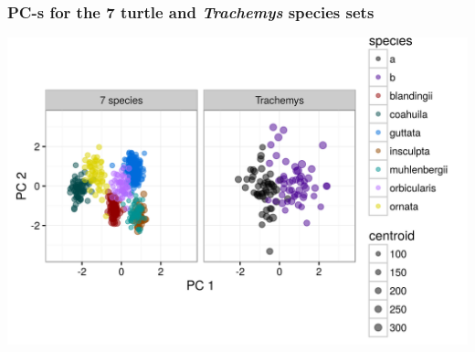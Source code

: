 \documentclass{beamer}
\begin{document}
\begin{frame}
  \frametitle{PC-s for the 7 turtle and \textit{Trachemys} species sets}
  \begin{center}
    \includegraphics[width=\textwidth,height=0.8\textheight,keepaspectratio=true]{figure/other_pc_graph}
  \end{center}
\end{frame}
\end{document}
